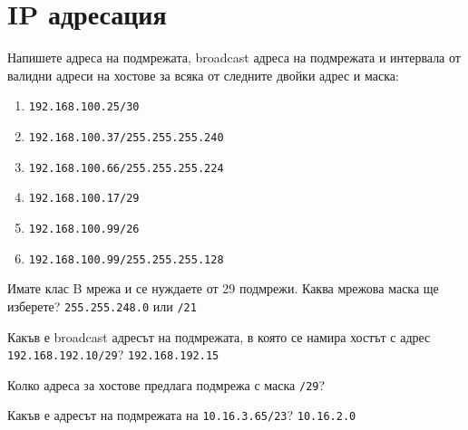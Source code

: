 
\section{IP адресация}
\begin{q}
  Напишете адреса на подмрежата, broadcast адреса на подмрежата и интервала от
  валидни адреси на хостове за всяка от следните двойки адрес и маска:
  \begin{enumerate}
  \item \texttt{192.168.100.25/30}
  \item \texttt{192.168.100.37/255.255.255.240}
  \item \texttt{192.168.100.66/255.255.255.224}
  \item \texttt{192.168.100.17/29}
  \item \texttt{192.168.100.99/26}
  \item \texttt{192.168.100.99/255.255.255.128}
  \end{enumerate}
\end{q}

\begin{q}
  Имате клас B мрежа и се нуждаете от 29 подмрежи. Каква мрежова маска ще
  изберете? \rans \texttt{255.255.248.0} или \texttt{/21}
\end{q}

\begin{q}
  Какъв е broadcast адресът на подмрежата, в която се намира хостът с адрес
  \texttt{192.168.192.10/29}? \rans \texttt{192.168.192.15}
\end{q}

\begin{q}
  Колко адреса за хостове предлага подмрежа с маска \texttt{/29}? 
\end{q}

\begin{q}
  Какъв е адресът на подмрежата на \texttt{10.16.3.65/23}? \rans
  \texttt{10.16.2.0}
\end{q}

